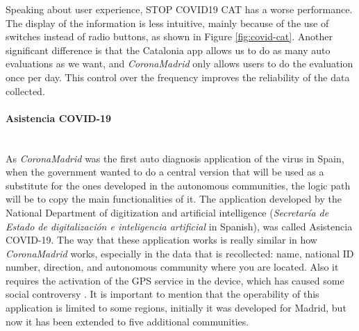 \documentclass[a4paper, 12pt]{article}
\begin{document}
Speaking about user experience, STOP COVID19 CAT has a worse performance. The display of the information is less intuitive, mainly because of the use of switches instead of radio buttons, as shown in Figure \ref{fig:covid-cat}. Another significant difference is that the Catalonia app allows us to do as many auto evaluations as we want, and \textit{CoronaMadrid} only allows users to do the evaluation once per day. This control over the frequency improves the reliability of the data collected. 

\paragraph{Asistencia COVID-19} \mbox{} \\

As \textit{CoronaMadrid} was the first auto diagnosis application of the virus in Spain, when the government wanted to do a central version that will be used as a substitute for the ones developed in the autonomous communities, the logic path will be to copy the main functionalities of it. The application developed by the National Department of digitization and artificial intelligence (\textit{Secretaría de Estado de digitalización e inteligencia artificial} in Spanish), was called Asistencia COVID-19. The way that these application works is really similar in how \textit{CoronaMadrid} works, especially in the data that is recollected: name, national ID number, direction, and autonomous community where you are located. Also it requires the activation of the GPS service in the device, which has caused some social controversy \cite{geolocalization-asistencia-covid-19}. It is important to mention that the operability of this application is limited to some regions, initially it was developed for Madrid, but now it has been extended to five additional communities.\\
\end{document}
